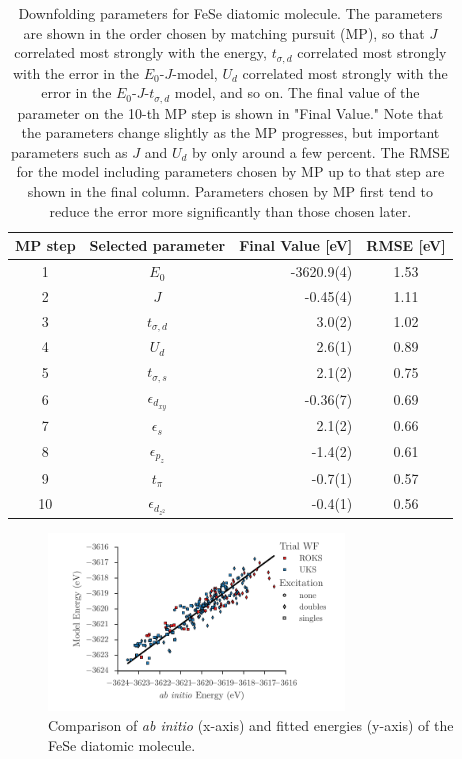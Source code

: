 \begin{table}[ht]
\label{tab:fese}
\centering
\begin{tabular}{|c|c|r|c|}
  \hline
  MP step & Selected parameter & Final Value [eV]  & RMSE [eV] \\
  \hline
  1 & $E_0$                    &  -3620.9(4) & 1.53 \\
  2 & $J$                      &  -0.45(4)   & 1.11 \\
  3 & $t_{\sigma,d}$           &  3.0(2)     & 1.02 \\
  4 & $U_d$                    &  2.6(1)     & 0.89 \\
  5 & $t_{\sigma,s}$           &  2.1(2)     & 0.75 \\
  6 & $\epsilon_{d_{xy}}$      &  -0.36(7)   & 0.69 \\
  7 & $\epsilon_{s}$           &  2.1(2)     & 0.66 \\
  8 & $\epsilon_{p_z}$         &  -1.4(2)    & 0.61 \\
  9 & $t_\pi$                  &  -0.7(1)    & 0.57 \\
  10& $\epsilon_{d_{z^2}}$     &  -0.4(1)    & 0.56 \\
\hline
\end{tabular}
\caption{
    Downfolding parameters for FeSe diatomic molecule. 
    The parameters are shown in the order chosen by matching pursuit (MP), so that $J$ correlated most strongly with the energy, $t_{\sigma,d}$ correlated most strongly with the error in the $E_0$-$J$-model, $U_d$ correlated most strongly with the error in the $E_0$-$J$-$t_{\sigma,d}$ model, and so on.
    The final value of the parameter on the 10-th MP step is shown in "Final Value."
    Note that the parameters change slightly as the MP progresses, but important parameters such as $J$ and $U_d$ by only around a few percent.
    The RMSE for the model including parameters chosen by MP up to that step are shown in the final column. 
    Parameters chosen by MP first tend to reduce the error more significantly than those chosen later. 
  }
\end{table} 

\begin{figure}[htb]
\centering
\includegraphics[width=0.7\textwidth]{./Figures/fese.pdf}
  \caption{
    Comparison of \textit{ab initio} (x-axis) and fitted energies (y-axis) of the FeSe diatomic molecule.
  }
  \label{fig:fese}
\end{figure}
